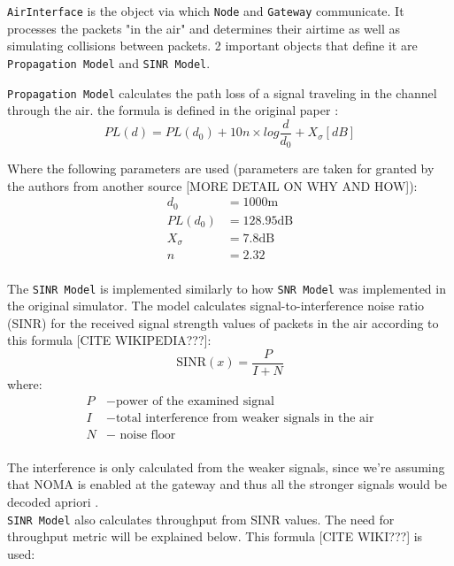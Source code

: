 \texttt{AirInterface} is the object via which \texttt{Node} and \texttt{Gateway} communicate. It processes the packets "in the air" and determines their airtime as well as simulating collisions between packets. 2 important objects that define it are \texttt{Propagation Model} and \texttt{SINR Model}.\\

\newpage

\texttt{Propagation Model} calculates the path loss 
of a signal traveling in the channel through the air.
the formula is defined in the original paper \cite{simulator} :
\begin{equation}
    PL(d) = PL(d_0) + 10n\times log\frac{d}{d_0} + X_{\sigma} [dB]
\end{equation}

Where the following parameters are used (parameters are taken for granted by the authors \cite{simulator} from another source \cite{propagation_model_parameters} [MORE DETAIL ON WHY AND HOW]):
\begin{align*}
     d_0 & = 1000 \text{m}\\
     PL(d_0) & = 128.95 \text{dB}\\
     X_{\sigma} & = 7.8 \text{dB}\\
     n & = 2.32\\
\end{align*}

The \texttt{SINR Model} is implemented similarly to how \texttt{SNR Model} was implemented in the original simulator. The model calculates signal-to-interference noise ratio (SINR) for the received signal strength values of packets in the air according to this formula [CITE WIKIPEDIA???]:
\begin{equation}
    \text{SINR}(x) = \frac{P}{I + N}
\end{equation}
where:
\begin{align*}
     P &- \text{power of the examined signal}\\
     I &- \text{total interference from weaker signals in the air}\\
     N &- \text{ noise floor}\\
\end{align*}

The interference is only calculated from the weaker signals, since we're assuming that NOMA is enabled at 
the gateway and thus all the stronger signals would be
decoded apriori \cite{noma_original}.\\

\texttt{SINR Model} also calculates throughput from SINR values. The need for throughput metric will be explained below. This formula [CITE WIKI???] is used:

